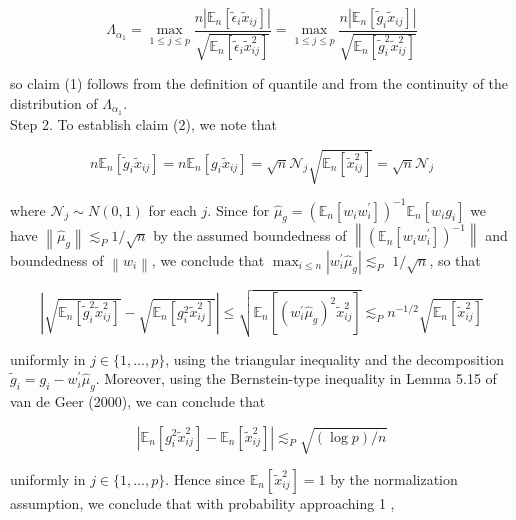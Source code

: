 \documentclass[10pt]{article}
\begin{document}
\[
\Lambda_{\alpha_{1}}=\max _{1 \leqslant j \leqslant p} \frac{n\left|\mathbb{E}_{n}\left[\tilde{\epsilon}_{i} \tilde{x}_{i j}\right]\right|}{\sqrt{\mathbb{E}_{n}\left[\tilde{\epsilon}_{i} \tilde{x}_{i j}^{2}\right]}}=\max _{1 \leqslant j \leqslant p} \frac{n\left|\mathbb{E}_{n}\left[\tilde{g}_{i} \tilde{x}_{i j}\right]\right|}{\sqrt{\mathbb{E}_{n}\left[\tilde{g}_{i}^{2} \tilde{x}_{i j}^{2}\right]}}
\]

so claim (1) follows from the definition of quantile and from the continuity of the distribution of \(\Lambda_{\alpha_{1}}\).\\
Step 2. To establish claim (2), we note that

\[
n \mathbb{E}_{n}\left[\tilde{g}_{i} \tilde{x}_{i j}\right]=n \mathbb{E}_{n}\left[g_{i} \tilde{x}_{i j}\right]=\sqrt{n} \mathcal{N}_{j} \sqrt{\mathbb{E}_{n}\left[\tilde{x}_{i j}^{2}\right]}=\sqrt{n} \mathcal{N}_{j}
\]

where \(\mathcal{N}_{j} \sim N(0,1)\) for each \(j\). Since for \(\widehat{\mu}_{g}=\left(\mathbb{E}_{n}\left[w_{i} w_{i}^{\prime}\right]\right)^{-1} \mathbb{E}_{n}\left[w_{i} g_{i}\right]\) we have \(\left\|\widehat{\mu}_{g}\right\| \lesssim_{P} 1 / \sqrt{n}\) by the assumed boundedness of \(\left\|\left(\mathbb{E}_{n}\left[w_{i} w_{i}^{\prime}\right]\right)^{-1}\right\|\) and boundedness of \(\left\|w_{i}\right\|\), we conclude that \(\max _{i \leqslant n}\left|w_{i}^{\prime} \widehat{\mu}_{g}\right| \lesssim_{P}\) \(1 / \sqrt{n}\), so that

\[
\left|\sqrt{\mathbb{E}_{n}\left[\tilde{g}_{i}^{2} \tilde{x}_{i j}^{2}\right]}-\sqrt{\mathbb{E}_{n}\left[g_{i}^{2} \tilde{x}_{i j}^{2}\right]}\right| \leqslant \sqrt{\mathbb{E}_{n}\left[\left(w_{i}^{\prime} \widehat{\mu}_{g}\right)^{2} \tilde{x}_{i j}^{2}\right]} \lesssim_{P} n^{-1 / 2} \sqrt{\mathbb{E}_{n}\left[\tilde{x}_{i j}^{2}\right]}
\]

uniformly in \(j \in\{1, \ldots, p\}\), using the triangular inequality and the decomposition \(\tilde{g}_{i}=g_{i}-w_{i}^{\prime} \widehat{\mu}_{g}\). Moreover, using the Bernstein-type inequality in Lemma 5.15 of van de Geer (2000), we can conclude that

\[
\left|\mathbb{E}_{n}\left[g_{i}^{2} \tilde{x}_{i j}^{2}\right]-\mathbb{E}_{n}\left[\tilde{x}_{i j}^{2}\right]\right| \lesssim_{P} \sqrt{(\log p) / n}
\]

uniformly in \(j \in\{1, \ldots, p\}\). Hence since \(\mathbb{E}_{n}\left[\tilde{x}_{i j}^{2}\right]=1\) by the normalization assumption, we conclude that with probability approaching 1 ,
\end{document}
